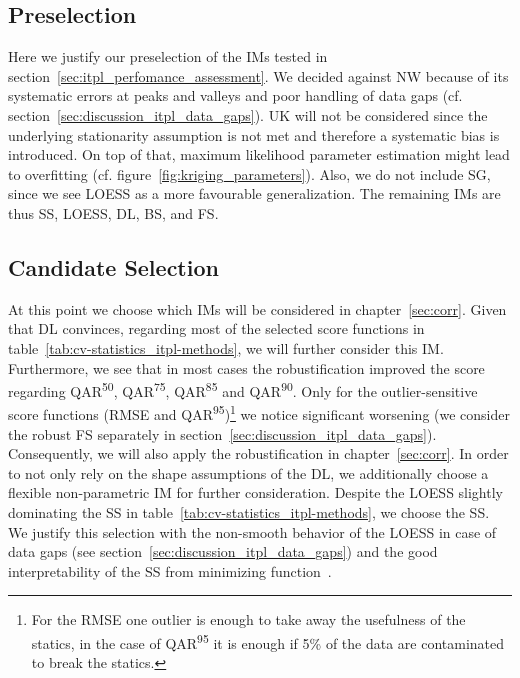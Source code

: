 {    \subsection{Preselection}{\label{sec:itpl_preselection}
        Here we justify our preselection of the {{IM}}s tested in section~\ref{sec:itpl_perfomance_assessment}. 
        We decided against NW because of its systematic errors at peaks and valleys and poor handling of data gaps (cf. section~\ref{sec:discussion_itpl_data_gaps}). 
        UK will not be considered since the underlying stationarity assumption is not met and therefore a systematic bias is introduced. On top of that, maximum likelihood parameter estimation might lead to overfitting (cf. figure~\ref{fig:kriging_parameters}).
        Also, we do not include SG, since we see LOESS as a more favourable generalization.
        The remaining IMs are thus SS, LOESS, DL, BS, and FS.
    }

    \subsection{Candidate Selection}{\label{sec:itpl_candiate_selection}
        At this point we choose which IMs will be considered in chapter~\ref{sec:corr}.
        Given that DL convinces, regarding most of the selected score functions in table~\ref{tab:cv-statistics_itpl-methods}, we will further consider this IM. Furthermore, we see that in most cases the robustification improved the score regarding QAR\textsuperscript{50}, QAR\textsuperscript{75}, QAR\textsuperscript{85} and QAR\textsuperscript{90}. Only for the outlier-sensitive score functions (RMSE and QAR\textsuperscript{95})\footnote{For the RMSE one outlier is enough to take away the usefulness of the statics, in the case of QAR\textsuperscript{95} it is enough if 5\% of the data are contaminated to break the statics.} we notice significant worsening (we consider the robust FS separately in section~\ref{sec:discussion_itpl_data_gaps}). Consequently, we will also apply the robustification in chapter~\ref{sec:corr}.
        In order to not only rely on the shape assumptions of the DL, we additionally choose a flexible non-parametric IM for further consideration. Despite the LOESS slightly dominating the SS in table~\ref{tab:cv-statistics_itpl-methods}, we choose the SS. We justify this selection with the non-smooth behavior of the LOESS in case of data gaps (see section~\ref{sec:discussion_itpl_data_gaps}) and the good interpretability of the SS from minimizing function~.
    }
}


